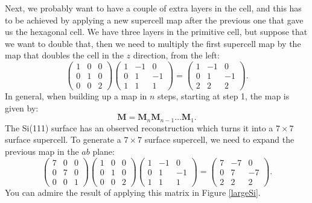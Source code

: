 \documentclass[11pt]{article}
\begin{document}
Next, we probably want to have a couple of extra layers in the cell, and this has to be achieved by applying a new supercell map after the previous one that gave us the hexagonal cell. We have three layers in the primitive cell, but suppose that we want to double that, then we need to multiply the first supercell map by the map that doubles the cell in the $z$ direction, from the left:
\begin{equation}
\begin{pmatrix}
1 & 0 & 0\\
0 & 1 & 0\\
0 & 0 & 2
\end{pmatrix}
\begin{pmatrix}
1 & -1 & 0\\
0 & 1 & -1\\
1 & 1 & 1
\end{pmatrix}
=
\begin{pmatrix}
1 & -1 & 0\\
0 & 1 & -1\\
2 & 2 & 2
\end{pmatrix}.
\end{equation}
In general, when building up a map in $n$ steps, starting at step 1, the map is given by:
\begin{equation}
\mathbf{M} = \mathbf{M}_n\mathbf{M}_{n-1}\ldots\mathbf{M}_1.
\end{equation}
The Si(111) surface has an observed reconstruction which turns it into a $7\times 7$ surface supercell. To generate a $7\times7$ surface supercell, we need to expand the previous map in the $ab$ plane:
\begin{equation}
\begin{pmatrix}
7 & 0 & 0\\
0 & 7 & 0\\
0 & 0 & 1
\end{pmatrix}
\begin{pmatrix}
1 & 0 & 0\\
0 & 1 & 0\\
0 & 0 & 2
\end{pmatrix}
\begin{pmatrix}
1 & -1 & 0\\
0 & 1 & -1\\
1 & 1 & 1
\end{pmatrix}
=
\begin{pmatrix}
7 & -7 & 0\\
0 & 7 & -7\\
2 & 2 & 2
\end{pmatrix}.
\end{equation}
You can admire the result of applying this matrix in Figure \ref{largeSi}.
\end{document}
